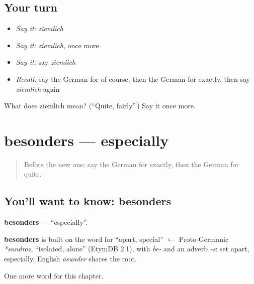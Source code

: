 \subsection*{Your turn}
\begin{itemize}
\raggedright
  \item \emph{Say it:} \emph{ziemlich}
  \item \emph{Say it:} \emph{ziemlich}, once more
  \item \emph{Say it:} say \emph{ziemlich}
  \item \emph{Recall:} say the German for of course, then the German for exactly, then say \emph{ziemlich} again
\end{itemize}

\begin{tcolorbox}[breakable,colback=teal!4,colframe=teal!35!black,title={Before you move on}]
What does ziemlich mean? (\textquotedblleft{}Quite, fairly\textquotedblright{}.) Say it once more.
\end{tcolorbox}
\section[besonders]{besonders — especially}

\label{lesson:GE-C173-besonders}



\begin{quote}
Before the new one: say the German for exactly, then the German for quite.
\end{quote}

\subsection*{You'll want to know: besonders}
\textbf{besonders} — \textquotedblleft{}especially\textquotedblright{}.

\begin{cousinweb}
\textbf{besonders} is built on the word for \textquotedblleft{}apart, special\textquotedblright{} $\leftarrow$ Proto-Germanic \emph{*sundraz}, \textquotedblleft{}isolated, alone\textquotedblright{} (EtymDB 2.1), with \emph{be-} and an adverb \emph{-s}: set apart, especially. English \emph{asunder} shares the root.
\end{cousinweb}

\begin{grammarlens}[title={What you've built}]
One more word for this chapter.
\end{grammarlens}

